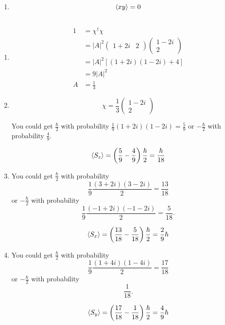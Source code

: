 \documentclass{article}
\begin{document}
\begin{enumerate}
  \item \[\braket{x y} = 0\]
\end{enumerate}

\subsection{}

\begin{enumerate}
  \item
        \begin{align*}
          1 & = \chi^\dagger \chi                  \\
            & = |A|^2 \begin{pmatrix}
                        1 + 2 i & 2
                      \end{pmatrix} \begin{pmatrix}
                                      1 - 2 i \\
                                      2
                                    \end{pmatrix} \\
            & = |A|^2 [(1 + 2 i) (1 - 2 i) + 4]    \\
            & = 9 |A|^2                            \\
          A & = \frac{1}{3}
        \end{align*}

  \item

        \[\chi = \frac{1}{3} \begin{pmatrix}
            1 - 2 i \\
            2
          \end{pmatrix}\]

        You could get $\frac{\hbar}{2}$ with probability $\frac{1}{9} (1 + 2 i) (1 - 2 i) = \frac{5}{9}$ or $-\frac{\hbar}{2}$ with probability $\frac{4}{9}$.

        \[\braket{S_z} = \left( \frac{5}{9} - \frac{4}{9} \right) \frac{\hbar}{2} = \frac{\hbar}{18}\]

  \item

        You could get $\frac{\hbar}{2}$ with probability \[\frac{1}{9} \frac{(3 + 2 i) (3 - 2 i)}{2} = \frac{13}{18}\] or $-\frac{\hbar}{2}$ with probability \[\frac{1}{9} \frac{(-1 + 2 i) (-1 - 2 i)}{2} = \frac{5}{18}.\]

        \[\braket{S_x} = \left( \frac{13}{18} - \frac{5}{18} \right) \frac{\hbar}{2} = \frac{2}{9} \hbar\]

  \item

        You could get $\frac{\hbar}{2}$ with probability \[\frac{1}{9} \frac{(1 + 4 i) (1 - 4 i)}{2} = \frac{17}{18}\] or $-\frac{\hbar}{2}$ with probability \[\frac{1}{18}.\]

        \[\braket{S_y} = \left( \frac{17}{18} - \frac{1}{18} \right) \frac{\hbar}{2} = \frac{4}{9} \hbar\]
\end{enumerate}
\end{document}
